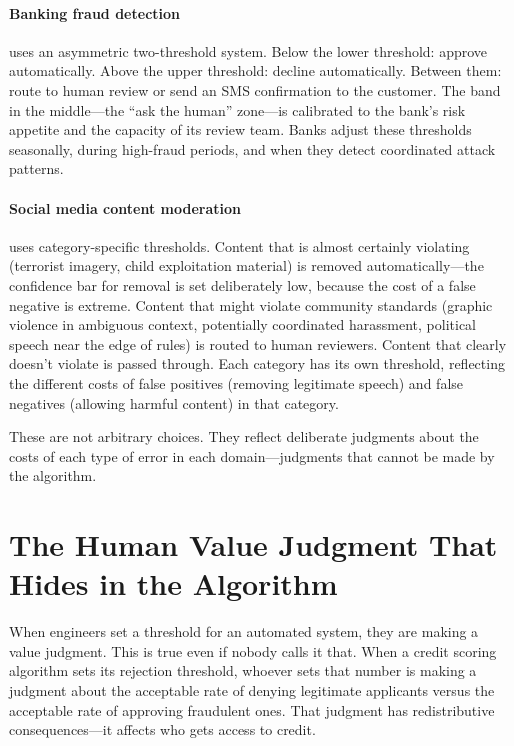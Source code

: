 \paragraph{Banking fraud detection} uses an asymmetric two-threshold system. Below the lower threshold: approve automatically. Above the upper threshold: decline automatically. Between them: route to human review or send an SMS confirmation to the customer. The band in the middle---the ``ask the human'' zone---is calibrated to the bank's risk appetite and the capacity of its review team. Banks adjust these thresholds seasonally, during high-fraud periods, and when they detect coordinated attack patterns.

\paragraph{Social media content moderation} uses category-specific thresholds. Content that is almost certainly violating (terrorist imagery, child exploitation material) is removed automatically---the confidence bar for removal is set deliberately low, because the cost of a false negative is extreme. Content that might violate community standards (graphic violence in ambiguous context, potentially coordinated harassment, political speech near the edge of rules) is routed to human reviewers. Content that clearly doesn't violate is passed through. Each category has its own threshold, reflecting the different costs of false positives (removing legitimate speech) and false negatives (allowing harmful content) in that category.

\begin{examplebox}[title={Deliberate Design, Not Arbitrary Choice}]
These are not arbitrary choices. They reflect deliberate judgments about the costs of each type of error in each domain---judgments that cannot be made by the algorithm.
\end{examplebox}

\section{The Human Value Judgment That Hides in the Algorithm}

When engineers set a threshold for an automated system, they are making a value judgment. This is true even if nobody calls it that. When a credit scoring algorithm sets its rejection threshold, whoever sets that number is making a judgment about the acceptable rate of denying legitimate applicants versus the acceptable rate of approving fraudulent ones. That judgment has redistributive consequences---it affects who gets access to credit.

